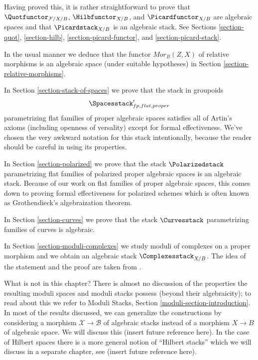 \medskip\noindent
Having proved this, it is rather straightforward to prove that
$\Quotfunctor_{\mathcal{F}/X/B}$, $\Hilbfunctor_{X/B}$, and
$\Picardfunctor_{X/B}$ are algebraic spaces and that
$\Picardstack_{X/B}$ is an algebraic stack. See
Sections \ref{section-quot}, \ref{section-hilb},
\ref{section-picard-functor}, and \ref{section-picard-stack}.

\medskip\noindent
In the usual manner we deduce that the functor $\mathit{Mor}_B(Z, X)$
of relative morphisms is an algebraic space (under suitable
hypotheses) in Section \ref{section-relative-morphisms}.

\medskip\noindent
In Section \ref{section-stack-of-spaces} we prove that the stack in
groupoids
$$
\Spacesstack'_{fp, flat, proper}
$$
parametrizing flat families of proper algebraic spaces satisfies all
of Artin's axioms (including openness of versality) except for
formal effectiveness. We've chosen the very awkward notation for
this stack intentionally, because the reader should be careful
in using its properties.

\medskip\noindent
In Section \ref{section-polarized} we prove that the stack
$\Polarizedstack$
parametrizing flat families of polarized proper algebraic spaces
is an algebraic stack. Because of our work on flat families of proper
algebraic spaces, this comes down to proving
formal effectiveness for polarized schemes which is often known
as Grothendieck's algebraization theorem.

\medskip\noindent
In Section \ref{section-curves} we prove that the stack
$\Curvesstack$ parametrizing families of curves is algebraic.

\medskip\noindent
In Section \ref{section-moduli-complexes}
we study moduli of complexes on a proper morphism
and we obtain an algebraic stack $\Complexesstack_{X/B}$.
The idea of the statement and the proof are taken from
\cite{lieblich-complexes}.

\medskip\noindent
What is not in this chapter? There is almost no discussion of
the properties the resulting moduli spaces and moduli stacks
possess (beyond their algebraicity); to read about this we
refer to Moduli Stacks, Section \ref{moduli-section-introduction}.
In most of the results discussed, we can generalize the constructions
by considering a morphism $\mathcal{X} \to \mathcal{B}$ of algebraic
stacks instead of a morphism $X \to B$ of algebraic space.
We will discuss this (insert future reference here).
In the case of Hilbert spaces there is a more general notion of
``Hilbert stacks'' which we will discuss in a separate chapter, see
(insert future reference here).




